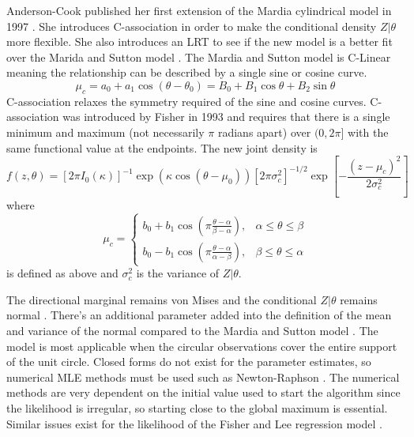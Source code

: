 Anderson-Cook published her first extension of the Mardia cylindrical model in 1997 \cite{anderson-cook_extension_1997}. She introduces C-association in order to make the conditional density $Z|\theta$ more flexible. She also introduces an LRT to see if the new model is a better fit over the Marida and Sutton model \cite{mardia_model_1978}. The Mardia and Sutton model is C-Linear meaning the relationship can be described by a single sine or cosine curve. \[\mu_c = a_0 + a_1 \cos(\theta - \theta_0) = B_0 + B_1 \cos \theta + B_2 \sin\theta\] C-association relaxes the symmetry required of the sine and cosine curves. C-association was introduced by Fisher in 1993 \cite{fisher_statistical_1995} and requires that there is a single minimum and maximum (not necessarily $\pi$ radians apart) over $(0,2\pi]$ with the same functional value at the endpoints. The new joint density is \[f(z,\theta) = [2\pi I_0(\kappa)]^{-1}\exp(\kappa\cos(\theta - \mu_0)) [2\pi \sigma^2_c]^{-1/2}\exp\left[-\frac{(z - \mu_c)^2}{2\sigma_c^2}\right]\] where \[\mu_c =\begin{cases}
b_0 + b_1 \cos(\pi\frac{\theta - \alpha}{\beta - \alpha}), & \alpha \leq \theta \leq \beta \\
b_0 - b_1 \cos(\pi\frac{\theta - \alpha}{\alpha - \beta}), & \beta \leq \theta \leq \alpha 
\end{cases}\] is defined as above and $\sigma_c^2$ is the variance of $Z|\theta$.

The directional marginal remains von Mises and the conditional $Z|\theta$ remains normal \cite{anderson-cook_extension_1997}. There’s an additional parameter added into the definition of the mean and variance of the normal compared to the Mardia and Sutton model \cite{mardia_model_1978}. The model is most applicable when the circular observations cover the entire support of the unit circle. Closed forms do not exist for the parameter estimates, so numerical MLE methods must be used such as Newton-Raphson \cite{anderson-cook_extension_1997}. The numerical methods are very dependent on the initial value used to start the algorithm since the likelihood is irregular, so starting close to the global maximum is essential. Similar issues exist for the likelihood of the Fisher and Lee regression model \cite{fisher_regression_1992}.

